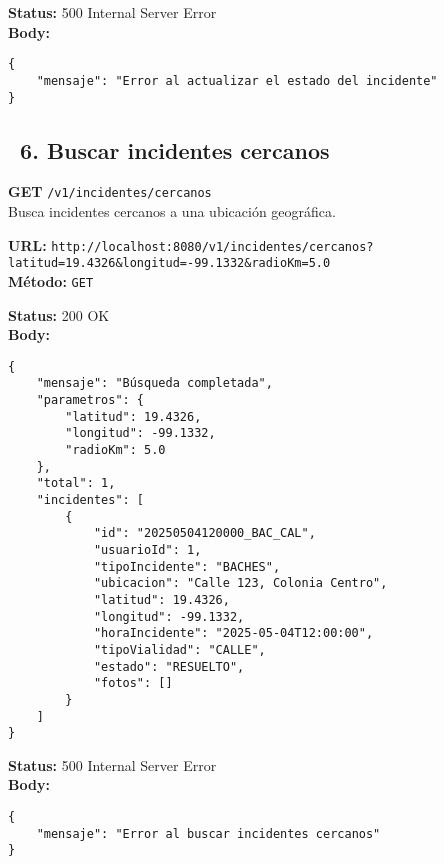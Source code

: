 \begin{tcolorbox}[response]
    \textbf{Status:} 500 Internal Server Error\\
    \textbf{Body:}
    \begin{verbatim}
{
    "mensaje": "Error al actualizar el estado del incidente"
}
    \end{verbatim}
\end{tcolorbox}

\subsection*{\faServer\ 6. Buscar incidentes cercanos}
\begin{tcolorbox}[endpoint]
    \textbf{GET} \texttt{/v1/incidentes/cercanos}\\
    Busca incidentes cercanos a una ubicación geográfica.
\end{tcolorbox}

\begin{tcolorbox}[request]
    \textbf{URL:} \textcolor{urlColor}{\texttt{http://localhost:8080/v1/incidentes/cercanos?latitud=19.4326\&longitud=-99.1332\&radioKm=5.0}}\\
    \textbf{Método:} \textcolor{methodColor}{\texttt{GET}}
\end{tcolorbox}

\begin{tcolorbox}[response]
    \textbf{Status:} 200 OK\\
    \textbf{Body:}
    \begin{verbatim}
{
    "mensaje": "Búsqueda completada",
    "parametros": {
        "latitud": 19.4326,
        "longitud": -99.1332,
        "radioKm": 5.0
    },
    "total": 1,
    "incidentes": [
        {
            "id": "20250504120000_BAC_CAL",
            "usuarioId": 1,
            "tipoIncidente": "BACHES",
            "ubicacion": "Calle 123, Colonia Centro",
            "latitud": 19.4326,
            "longitud": -99.1332,
            "horaIncidente": "2025-05-04T12:00:00",
            "tipoVialidad": "CALLE",
            "estado": "RESUELTO",
            "fotos": []
        }
    ]
}
    \end{verbatim}
\end{tcolorbox}

\begin{tcolorbox}[response]
    \textbf{Status:} 500 Internal Server Error\\
    \textbf{Body:}
    \begin{verbatim}
{
    "mensaje": "Error al buscar incidentes cercanos"
}
    \end{verbatim}
\end{tcolorbox}

